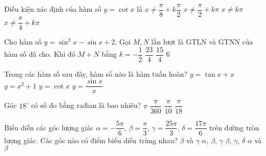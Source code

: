 \begin{ex}%
        Điều kiện xác định của hàm số $y=\cot x$ là
        \choice
        { $x \ne \dfrac{\pi}{8}+k\dfrac{\pi}{2}$}
        {$x \ne \dfrac{\pi}{2}+k\pi$}
        {\True $x \ne k\pi$}
        {$x \ne \dfrac{\pi}{4}+k\pi$}
    \end{ex}

\begin{ex}%
        Cho hàm số $y=\sin^2x-\sin x+2$. Gọi $M,N$ lần lượt là GTLN và GTNN của hàm số đã cho. Khi đó $M+N$ bằng
        \choice
        {$k=-\dfrac{1}{2}$}
        {\True $\dfrac{23}{4}$}
        {$\dfrac{15}{4}$}
        {$6$}
    \end{ex}

\begin{ex}%
    Trong các hàm số sau đây, hàm số nào là hàm tuần hoàn?
    \choice
    {$y=\tan x+x$}
    {$y=x^2+1$}
    {\True $y=\cot x$}
    {$y=\dfrac{\sin x}{x}$}
\end{ex}

\begin{ex}%
        Góc $18^\circ$ có số đo bằng rađian là bao nhiêu?
        \choice
        {$\pi$}
        {$\dfrac{\pi}{360}$}
        {\True $\dfrac{\pi}{10}$}
        {$\dfrac{\pi}{18}$}
    \end{ex}

\begin{ex}%
    Biểu diễn các góc lượng giác $\alpha=-\dfrac{5\pi}{6}$, $\beta=\dfrac{\pi}{3}$, $\gamma=\dfrac{25\pi}{3}$, $\delta=\dfrac{17\pi}{6}$ trên đường tròn lượng giác. Các góc nào có điểm biểu diễn trùng nhau?
    \choice
    {\True $\beta$ và $\gamma$}
    {$\alpha$, $\beta$, $\gamma$}
    {$\beta$, $\gamma$, $\delta$}
    {$\alpha$ và $\beta$}
\end{ex}

